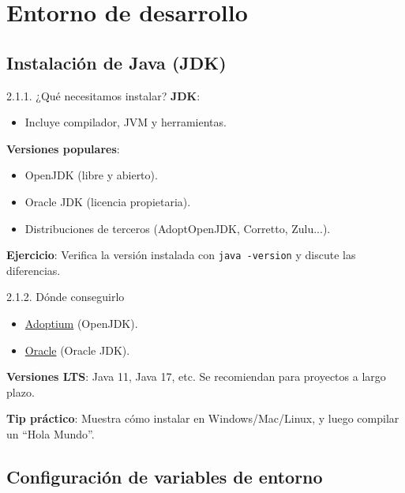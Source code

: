 \documentclass{beamer}
\begin{document}
\section{Entorno de desarrollo}

\subsection{Instalación de Java (JDK)}

\begin{frame}{2.1.1. ¿Qué necesitamos instalar?}
\textbf{JDK}:  
\begin{itemize}
  \item Incluye compilador, JVM y herramientas.
\end{itemize}

\textbf{Versiones populares}:
\begin{itemize}
  \item OpenJDK (libre y abierto).
  \item Oracle JDK (licencia propietaria).
  \item Distribuciones de terceros (AdoptOpenJDK, Corretto, Zulu...).
\end{itemize}

\textbf{Ejercicio}:  
Verifica la versión instalada con \texttt{java -version} y discute las diferencias.
\end{frame}

\begin{frame}{2.1.2. Dónde conseguirlo}
\begin{itemize}
  \item \href{https://adoptium.net/}{Adoptium} (OpenJDK).
  \item \href{https://www.oracle.com/java/technologies/downloads/}{Oracle} (Oracle JDK).
\end{itemize}

\textbf{Versiones LTS}: Java 11, Java 17, etc.  
Se recomiendan para proyectos a largo plazo.

\textbf{Tip práctico}:  
Muestra cómo instalar en Windows/Mac/Linux, y luego compilar un “Hola Mundo”.
\end{frame}

\subsection{Configuración de variables de entorno}
\end{document}
